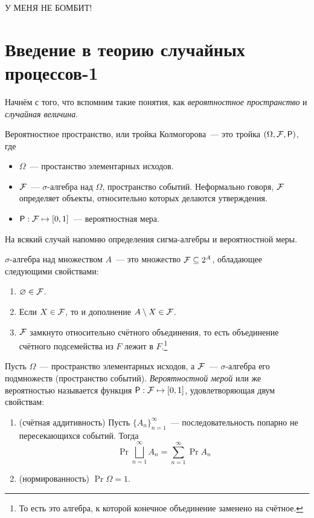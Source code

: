\begin{center}
	\Huge{У МЕНЯ НЕ БОМБИТ!}
\end{center}
\section{Введение в теорию случайных процессов-1}
Начнём с того, что вспомним такие понятия, как \emph{вероятностное 
пространство} и \emph{случайная величина}.

\begin{definition}
	Вероятностное пространство, или тройка Колмогорова~--- это тройка 
	\((\Omega, \F, \Pr)\), где
	\begin{itemize}
		\item \(\Omega\)~--- простанство элементарных исходов. 
		\item \(\mathcal{F}\)~--- \(\sigma\)-алгебра над \(\Omega\), пространство 
		событий. Неформально говоря, \(\mathcal{F}\) определяет объекты, относительно 
		которых делаются утверждения. 
		\item \(\Pr : \F \mapsto [0, 1]\)~--- вероятностная мера. 
	\end{itemize}
\end{definition}

На всякий случай напомню определения сигма-алгебры и вероятностной меры.
\begin{definition}
	\(\sigma\)-алгебра над множеством \(A\)~--- это множество \(\mathcal{F} \subseteq 
	2^{A}\), обладающее следующими свойствами:
	\begin{enumerate}
		\item \(\varnothing \in \mathcal{F}\).
		\item Если \(X \in \mathcal{F}\), то и дополнение \(A \setminus X \in \mathcal{F}\).
		\item \(\mathcal{F}\) замкнуто относительно счётного объединения, то есть 
		объединение счётного подсемейства из \(F\) лежит в \(F\).\footnote{То 
		есть это алгебра, к которой конечное объединение заменено на счётное.}
	\end{enumerate}
\end{definition}

\begin{definition}
	Пусть \(\Omega\)~--- пространство элементарных исходов, а \(\mathcal{F}\)~--- 
	\(\sigma\)-алгебра его подмножеств (пространство событий). 
	\emph{Вероятностной мерой} или же вероятностью называется функция \(\Pr : 
	\F \mapsto [0, 1]\), удовлетворяющая двум свойствам:
	\begin{enumerate}
		\item (счётная аддитивность) Пусть \(\{A_{n}\}_{n = 1}^{\infty}\)~--- 
		последовательность попарно не пересекающихся событий. Тогда
		\[
			\Pr{\bigsqcup_{n = 1}^{\infty} A_{n}} = \sum_{n = 1}^{\infty} 
			\Pr{A_{n}}
		\]
		
		\item (нормированность) \(\Pr{\Omega} = 1\).
	\end{enumerate}
\end{definition}

